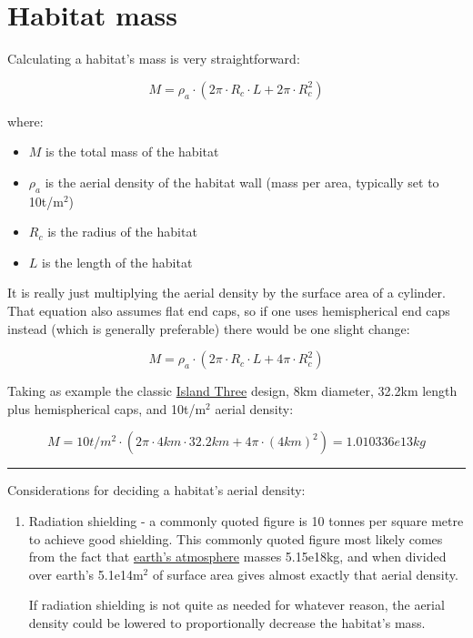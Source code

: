 \documentclass[a4paper]{article}
\begin{document}
	\section{Habitat mass}
	
	Calculating a habitat's mass is very straightforward:
	
	$$ M = \rho_a \cdot (2\pi \cdot R_c \cdot L + 2 \pi \cdot R_c^2) $$
	
	where:
	
	\begin{itemize}
		\item $M$ is the total mass of the habitat
		
		\item $\rho_a$ is the aerial density of the habitat wall (mass per area, typically set to 10t/m$^2$)
		
		\item $R_c$ is the radius of the habitat
		
		\item $L$ is the length of the habitat
	\end{itemize}
	
	It is really just multiplying the aerial density by the surface area of a cylinder. That equation also assumes flat end caps, so if one uses hemispherical end caps instead (which is generally preferable) there would be one slight change:
	
	$$ M = \rho_a \cdot (2\pi \cdot R_c \cdot L + 4 \pi \cdot R_c^2) $$
	
	\medskip
	
	Taking as example the classic \href{https://en.wikipedia.org/wiki/O%27Neill_cylinder#Islands}{Island Three} design, 8km diameter, 32.2km length plus hemispherical caps, and 10t/m$^2$ aerial density:
	
	$$ M = 10t/m^2 \cdot (2\pi \cdot 4km \cdot 32.2km + 4\pi \cdot (4km)^2) =  1.010336e13kg $$
	
	\noindent \rule{\linewidth}{1pt}
	
	\medskip
	
	Considerations for deciding a habitat's aerial density:
	
	\begin{enumerate}
		\item Radiation shielding - a commonly quoted figure is 10 tonnes per square metre to achieve good shielding. This commonly quoted figure most likely comes from the fact that \href{https://en.wikipedia.org/wiki/Atmosphere_of_Earth}{earth's atmosphere} masses 5.15e18kg, and when divided over earth's 5.1e14m$^2$ of surface area gives almost exactly that aerial density.
		
		\medskip
		
		If radiation shielding is not quite as needed for whatever reason, the aerial density could be lowered to proportionally decrease the habitat's mass.
	\end{enumerate}
	
\end{document}

